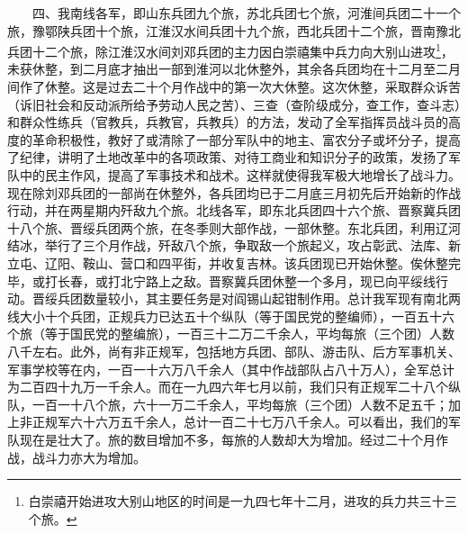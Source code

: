 \documentclass[cn,11pt,chinese]{elegantbook}
\begin{document}
　　四、我南线各军，即山东兵团九个旅，苏北兵团七个旅，河淮间兵团二十一个旅，豫鄂陕兵团十个旅，江淮汉水间兵团十九个旅，西北兵团十二个旅，晋南豫北兵团十二个旅，除江淮汉水间刘邓兵团的主力因白崇禧集中兵力向大别山进攻\footnote[6]{ 白崇禧开始进攻大别山地区的时间是一九四七年十二月，进攻的兵力共三十三个旅。}，未获休整，到二月底才抽出一部到淮河以北休整外，其余各兵团均在十二月至二月间作了休整。这是过去二十个月作战中的第一次大休整。这次休整，采取群众诉苦（诉旧社会和反动派所给予劳动人民之苦）、三查（查阶级成分，查工作，查斗志）和群众性练兵（官教兵，兵教官，兵教兵）的方法，发动了全军指挥员战斗员的高度的革命积极性，教好了或清除了一部分军队中的地主、富农分子或坏分子，提高了纪律，讲明了土地改革中的各项政策、对待工商业和知识分子的政策，发扬了军队中的民主作风，提高了军事技术和战术。这样就使得我军极大地增长了战斗力。现在除刘邓兵团的一部尚在休整外，各兵团均已于二月底三月初先后开始新的作战行动，并在两星期内歼敌九个旅。北线各军，即东北兵团四十六个旅、晋察冀兵团十八个旅、晋绥兵团两个旅，在冬季则大部作战，一部休整。东北兵团，利用辽河结冰，举行了三个月作战，歼敌八个旅，争取敌一个旅起义，攻占彰武、法库、新立屯、辽阳、鞍山、营口和四平街，并收复吉林。该兵团现已开始休整。俟休整完毕，或打长春，或打北宁路上之敌。晋察冀兵团休整一个多月，现已向平绥线行动。晋绥兵团数量较小，其主要任务是对阎锡山起钳制作用。总计我军现有南北两线大小十个兵团，正规兵力已达五十个纵队（等于国民党的整编师），一百五十六个旅（等于国民党的整编旅），一百三十二万二千余人，平均每旅（三个团）人数八千左右。此外，尚有非正规军，包括地方兵团、部队、游击队、后方军事机关、军事学校等在内，一百一十六万八千余人（其中作战部队占八十万人），全军总计为二百四十九万一千余人。而在一九四六年七月以前，我们只有正规军二十八个纵队，一百一十八个旅，六十一万二千余人，平均每旅（三个团）人数不足五千；加上非正规军六十六万五千余人，总计一百二十七万八千余人。可以看出，我们的军队现在是壮大了。旅的数目增加不多，每旅的人数却大为增加。经过二十个月作战，战斗力亦大为增加。\\
\end{document}
